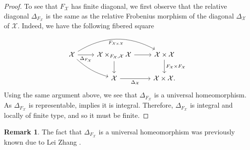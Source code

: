 \documentclass[11pt]{amsart}
\theoremstyle{plain}
\theoremstyle{definition}
\newtheorem{remark}[theorem]{Remark}
\numberwithin{equation}{section}
\numberwithin{theorem}{section}
\begin{document}
\begin{proof}
    To see that $F_\mathcal{X}$ has finite diagonal, we first observe that the relative diagonal $\Delta_{F_\mathcal{X}}$ is the same as the relative Frobenius morphism of the diagonal $\Delta_\mathcal{X}$ of $\mathcal{X}$. Indeed, we have the following fibered square
    \begin{displaymath}
        \begin{tikzcd}
            {\mathcal{X}} & {\mathcal{X}\times_{F_\mathcal{X},\mathcal{X}}\mathcal{X}} & {\mathcal{X}\times\mathcal{X}} \\
            & {\mathcal{X}} & {\mathcal{X}\times\mathcal{X}.}
            \arrow["\Delta_{F_\mathcal{X}}"', from=1-1, to=1-2]
            \arrow["F_{\mathcal{X}\times\mathcal{X}}"', bend right =-30pt, from=1-1, to=1-3]
            \arrow[bend right =12pt, from=1-1, to=2-2]
            \arrow[from=1-2, to=1-3]
            \arrow[from=1-2, to=2-2]
            \arrow["F_\mathcal{X}\times F_\mathcal{X}", from=1-3, to=2-3]
            \arrow["\Delta_\mathcal{X}"', from=2-2, to=2-3]
        \end{tikzcd}
    \end{displaymath}
    Using the same argument above, we see that $\Delta_{F_\mathcal{X}}$ is a universal homeomorphism. 
    As $\Delta_{F_\mathcal{X}}$ is representable, \cite[\href{https://stacks.math.columbia.edu/tag/04DF}{Tag 04DF}]{stacks-project} implies it is integral.
    Therefore, $\Delta_{F_\mathcal{X}}$ is integral and locally of finite type, and so it must be finite.
\end{proof}

\begin{remark}
    The fact that $\Delta_{F_\mathcal{X}}$ is a universal homeomorphism was previously known due to Lei Zhang \cite[Lemma 3.1]{Zhang:2024}.
\end{remark}
\end{document}
